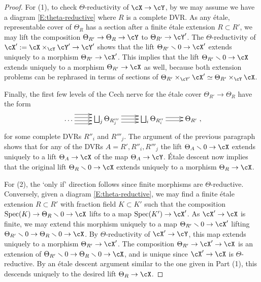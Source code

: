 \documentclass[a4paper]{amsart}
\numberwithin{equation}{section}
\theoremstyle{plain}
\theoremstyle{definition}
\DeclareMathOperator{\Spec}{Spec}
\begin{document}
\begin{proof}
For (1), to check $\Theta$-reductivity of $\cX \to \cY$, by  we may assume we have a diagram \eqref{E:theta-reductive} where $R$ is a complete DVR. As any \'etale, representable cover of $\Theta_R$ has a section after a finite \'etale extension  $R \subset R'$, we may lift the composition $\Theta_{R'} \to \Theta_R \to \cY$ to $\Theta_{R'} \to \cY'$. The $\Theta$-reductivity of $\cX' := \cX \times_{\cY} \cY' \to \cY'$ shows that the lift $\Theta_{R'} \smallsetminus 0 \to \cX'$ extends uniquely to a morphism $\Theta_{R'} \to \cX'$. This implies that the lift $\Theta_{R'} \smallsetminus 0 \to \cX$ extends uniquely to a morphism $\Theta_{R'} \to \cX$ as well, because both extension problems can be rephrased in terms of sections of $\Theta_{R'} \times_{\cY'} \cX' \simeq \Theta_{R'} \times_{\cY} \cX$.

Finally, the first few levels of the Cech nerve for the \'etale cover $\Theta_{R'} \to \Theta_R$ have the form
\[
\xymatrix{ \ldots \ar@<-1.5ex>[r] \ar@<-.5ex>[r] \ar@<.5ex>[r] \ar@<1.5ex>[r]  & \bigsqcup_j \Theta_{R'''_j} \ar@<-1ex>[r] \ar[r] \ar@<1ex>[r]  & \bigsqcup_i \Theta_{R''_i} \ar@<.5ex>[r] \ar@<-.5ex>[r]& \Theta_{R'} },
\]
for some complete DVRs $R''_i$ and $R'''_j$. The argument of the previous paragraph shows that for any of the DVRs $A=R',R''_i,R'''_j$ the lift $\Theta_A \smallsetminus 0 \to \cX$ extends uniquely to a lift $\Theta_A \to \cX$ of the map $\Theta_A \to \cY$. \'Etale descent now implies that the original lift $\Theta_{R} \smallsetminus 0 \to \cX$ extends uniquely to a morphism $\Theta_R \to \cX$.

For (2), the `only if' direction follows since finite morphisms are $\Theta$-reductive.
Conversely, given a diagram \eqref{E:theta-reductive}, we may find a finite \'etale extension $R \subset R'$ with fraction field $K \subset K'$ such that the composition $\Spec(K) \to \Theta_R \smallsetminus 0 \to \cX$ lifts to a map $\Spec(K') \to \cX'$.  As $\cX' \to \cX$ is finite, we may extend this morphism uniquely to a map $\Theta_{R'} \smallsetminus 0 \to \cX'$ lifting $\Theta_{R'} \smallsetminus 0 \to \Theta_{R} \smallsetminus 0 \to \cX$.  By $\Theta$-reductivity of $\cX' \to \cY$, this map extends uniquely to a morphism $\Theta_{R'} \to \cX'$. The composition $\Theta_{R'} \to \cX' \to \cX$ is an extension of $\Theta_{R'} \smallsetminus 0 \to \Theta_{R} \smallsetminus 0 \to \cX$, and is unique since $\cX' \to \cX$ is $\Theta$-reductive.   By an \'etale descent argument similar to the one given in Part (1), this descends uniquely to the desired lift $\Theta_{R} \to  \cX$.
\end{proof}
\end{document}
